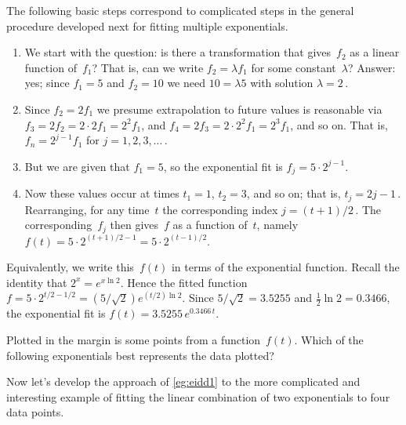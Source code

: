 \begin{reduce}
\begin{example}
\begin{solution}
The following basic steps correspond to complicated steps in the general procedure developed next for fitting multiple exponentials.
\begin{enumerate}
\item We start with the question: is there a transformation that gives~\(f_2\) as a linear function of~\(f_1\)?  That is, can we write \(f_2=\lambda f_1\) for some constant~\(\lambda\)?
Answer: yes; since \(f_1=5\) and \(f_2=10\) we need \(10=\lambda5\) with solution \(\lambda=2\)\,.
\item  Since \(f_2=2f_1\) we presume extrapolation to future values is reasonable via \(f_3=2f_2=2\cdot2f_1=2^2f_1\), and \(f_4=2f_3=2\cdot2^2f_1=2^3f_1\), and so on.   
That is, \(f_n=2^{j-1}f_1\) for \(j=1,2,3,\ldots\)\,.
\item But we are given that \(f_1=5\), so the exponential fit is \(f_j=5\cdot2^{j-1}\).
\item Now these values occur at times \(t_1=1\), \(t_2=3\), and so on; that is, \(t_j=2j-1\)\,.
Rearranging, for any time~\(t\) the corresponding index \(j=(t+1)/2\)\,.
The corresponding~\(f_j\) then gives~\(f\) as a function of~\(t\), namely \(f(t) =5\cdot 2^{(t+1)/2-1} =5\cdot 2^{(t-1)/2} \).

\end{enumerate}
Equivalently, we write this~\(f(t)\) in terms of the exponential function.
Recall the identity that \(2^x=e^{x\ln 2}\).
Hence the fitted function \(f=5\cdot 2^{t/2-1/2} =(5/\sqrt2)e^{(t/2)\ln2}\). 
Since \(5/\sqrt2=3.5255\) and \(\frac12\ln 2=0.3466\), the exponential fit is \(f(t)=3.5255\,e^{0.3466\,t}\).
\end{solution}
\end{example}


\begin{activity}
Plotted in the margin is some points from a function~\(f(t)\).  
Which of the following exponentials best represents the data plotted?
\end{activity}


Now let's develop the approach of \autoref{eg:eidd1} to the more complicated and interesting example of fitting the linear combination of two exponentials to four data points.



\end{reduce}
